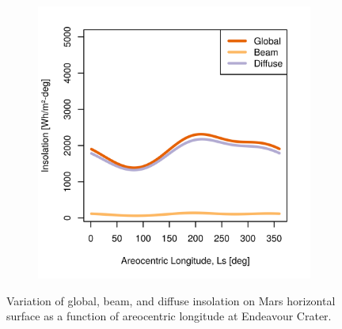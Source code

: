 \begin{figure}[h]
\begin{subfigure}[t]{\subfigureWidth}
  		\label{fig:sub:insolation-ls-tau-factor-2}
  	\end{subfigure}\hfill
	   \begin{subfigure}[t]{\subfigureWidth}
      \centering
  		\includegraphics[height=\graphicsHeight]{sections/mars-solar-energy/solar-radiation/plots/hh-hbh-and-hdh-as-a-function-of-ls-for-tau3-phi205-and-albedo-027}
  		\label{fig:sub:insolation-ls-tau-factor-3}
	   \end{subfigure}\hfill
	\caption{Variation of global, beam, and diffuse insolation on Mars horizontal surface as a function of areocentric longitude at Endeavour Crater.}
	\label{fig:plot:insolation-ls}
\vspace{-2ex}
\end{figure}

